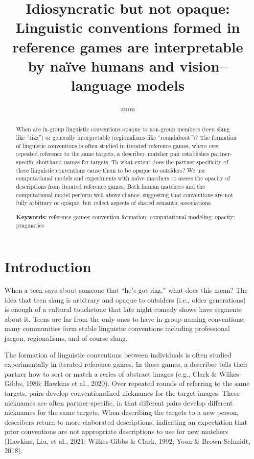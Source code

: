 \documentclass[10pt, letterpaper]{article}
\title{Idiosyncratic but not opaque: Linguistic conventions formed in
reference games are interpretable by naïve humans and vision--language
models}
\author{anon}
\begin{document}
\maketitle

\begin{abstract}
When are in-group linguistic conventions opaque to non-group members
(teen slang like ``rizz'') or generally interpretable (regionalisms like
``roundabout'')? The formation of linguistic conventions is often
studied in iterated reference games, where over repeated reference to
the same targets, a describer--matcher pair establishes partner-specific
shorthand names for targets. To what extent does the partner-specificity
of these linguistic conventions cause them to be opaque to outsiders? We
use computational models and experiments with naïve matchers to assess
the opacity of descriptions from iterated reference games. Both human
matchers and the computational model perform well above chance,
suggesting that conventions are not fully arbitrary or opaque, but
reflect aspects of shared semantic associations.

\textbf{Keywords:}
reference games; convention formation; computational modeling; opacity;
pragmatics
\end{abstract}

\section{Introduction}\label{introduction}

When a teen says about someone that ``he's got rizz,'' what does this
mean? The idea that teen slang is arbitrary and opaque to outsiders
(i.e., older generations) is enough of a cultural touchstone that late
night comedy shows have segments about it. Teens are far from the only
ones to have in-group naming conventions; many communities form stable
linguistic conventions including professional jargon, regionalisms, and
of course slang.

The formation of linguistic conventions between individuals is often
studied experimentally in iterated reference games. In these games, a
describer tells their partner how to sort or match a series of abstract
images (e.g., Clark \& Wilkes-Gibbs, 1986; Hawkins et al., 2020). Over
repeated rounds of referring to the same targets, pairs develop
conventionalized nicknames for the target images. These nicknames are
often partner-specific, in that different pairs develop different
nicknames for the same targets. When describing the targets to a new
person, describers return to more elaborated descriptions, indicating an
expectation that prior conventions are not appropriate descriptions to
use for new matchers (Hawkins, Liu, et al., 2021; Wilkes-Gibbs \& Clark,
1992; Yoon \& Brown-Schmidt, 2018).
\end{document}
